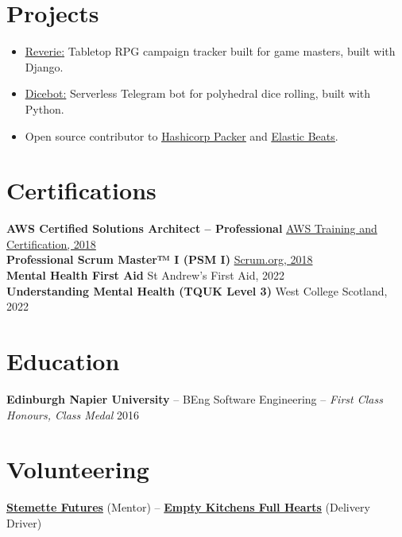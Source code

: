 \documentclass[11pt]{article}       %
\begin{document}
\vspace{-6.5pt}

\section*{Projects}
\begin{itemize}
  \item \underline{\href{https://github.com/oneirism/reverie}{Reverie}:} Tabletop RPG campaign tracker built for game masters, built with Django.
  \item \underline{\href{https://github.com/oneirism/dicebot}{Dicebot}:} Serverless Telegram bot for polyhedral dice rolling, built with Python.
  \item Open source contributor to \underline{\href{https://github.com/hashicorp/packer}{Hashicorp Packer}} and \underline{\href{https://github.com/elastic/beats}{Elastic Beats}}.
\end{itemize}

\vspace{-18.5pt}

\section*{Certifications}
\textbf{AWS Certified Solutions Architect – Professional} \hfill \href{https://www.credly.com/users/devenney}{AWS Training and Certification, 2018} \\
\textbf{Professional Scrum Master™ I (PSM I)} \hfill \href{https://www.credly.com/users/devenney}{Scrum.org, 2018} \\
\textbf{Mental Health First Aid} \hfill St Andrew's First Aid, 2022 \\
\textbf{Understanding Mental Health (TQUK Level 3)} \hfill West College Scotland, 2022 \\

\vspace{-6.5pt}

\section*{Education}
\textbf{Edinburgh Napier University} -- BEng Software Engineering -- \textit{First Class Honours, Class Medal} \hfill 2016 \\

\vspace{-6.5pt}

\section*{Volunteering}
\textbf{\href{https://stemettes.org/}{Stemette Futures}} (Mentor) -- \textbf{\href{https://www.emptykitchens.co.uk/}{Empty Kitchens Full Hearts}} (Delivery Driver) \\
\end{document}
